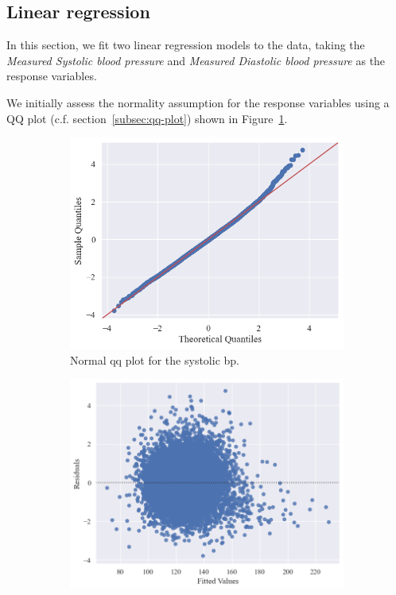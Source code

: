 \documentclass[12 pt]{scrartcl}
\numberwithin{equation}{section}
\begin{document}
\subsection{Linear regression}
\label{subsec:Linear regrerssion analysis}

In this section, we fit two linear regression models to the data, taking the \textit{Measured Systolic blood pressure} 
and \textit{Measured Diastolic blood pressure} as the response variables.

We initially assess the normality assumption for the response variables using a QQ plot (c.f. section~\ref{subsec:qq-plot})
shown in Figure~\ref{fig:subplot11}. 


\begin{figure}[H]
    \centering
    \begin{subfigure}[b]{0.49\textwidth}
        \includegraphics[width=\textwidth]{images/qq-plot-sys.png}
        \caption{Normal qq plot for the systolic bp.}
        \label{fig:subplot11}
    \end{subfigure}
    \hfill
    \begin{subfigure}[b]{0.49\textwidth}
        \includegraphics[width=\textwidth]{images/residual-plot-sys.png}

\end{subfigure}
\end{figure}
\end{document}

